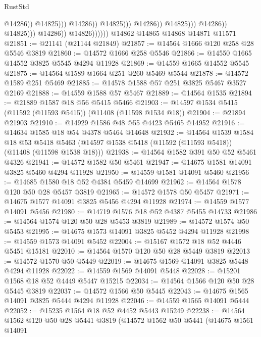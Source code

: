 \begin{lexlean}{RustStd}
\begin{coremodule}
                                                            @14286))
                                                        @14825)))
                                                  @14286))
                                              @14825)))
                                        @14286))
                                    @14825)))
                              @14286))
                          @14825)))
                    @14286))
                @14826))))))
    @14862
    @14865
    @14868
    @14871
    @11571
@21851 := @21141 (@21144 @21849)
@21857 := @14564 @1666 @120 @258 @28 @5546 @3819
@21860 := @14572 @1666 @258 @5546
@21866 := @14550 @1665 @14552 @3825 @5545 @4294 @11928
@21869 := @14559 @1665 @14552 @5545
@21875 := @14564 @1589 @1664 @251 @260 @5469 @5544
@21878 := @14572 @1589 @251 @5469
@21885 := @14578 @1588 @57 @251 @3825 @5467 @3527 @2169
@21888 := @14559 @1588 @57 @5467
@21889 := @14564 @1535
@21894 := @21889 @1587 @18 @56 @5415 @5466
@21903 := @14597 @1534 @5415 (@11592 (@11593 @5415)) (@11408 (@11598 @1534 @18))
@21904 := @21894 @21903
@21910 := @14929 @1586 @48 @55 @4423 @5465 @14952
@21916 := @14634 @1585 @18 @54 @4378 @5464 @14648
@21932 := @14564
    @1539
    @1584
    @18
    @53
    @5418
    @5463
    (@14597 @1538 @5418 (@11592 (@11593 @5418)) (@11408 (@11598 @1538 @18)))
@21938 := @14564 @1582 @391 @50 @52 @5461 @4326
@21941 := @14572 @1582 @50 @5461
@21947 := @14675 @1581 @14091 @3825 @5460 @4294 @11928
@21950 := @14559 @1581 @14091 @5460
@21956 := @14685 @1580 @18 @52 @4384 @5459 @14699
@21962 := @14564 @1578 @120 @50 @28 @5457 @3819
@21965 := @14572 @1578 @50 @5457
@21971 := @14675 @1577 @14091 @3825 @5456 @4294 @11928
@21974 := @14559 @1577 @14091 @5456
@21980 := @14719 @1576 @18 @52 @4387 @5455 @14733
@21986 := @14564 @1574 @120 @50 @28 @5453 @3819
@21989 := @14572 @1574 @50 @5453
@21995 := @14675 @1573 @14091 @3825 @5452 @4294 @11928
@21998 := @14559 @1573 @14091 @5452
@22004 := @15167 @1572 @18 @52 @4446 @5451 @15181
@22010 := @14564 @1570 @120 @50 @28 @5449 @3819
@22013 := @14572 @1570 @50 @5449
@22019 := @14675 @1569 @14091 @3825 @5448 @4294 @11928
@22022 := @14559 @1569 @14091 @5448
@22028 := @15201 @1568 @18 @52 @4449 @5447 @15215
@22034 := @14564 @1566 @120 @50 @28 @5445 @3819
@22037 := @14572 @1566 @50 @5445
@22043 := @14675 @1565 @14091 @3825 @5444 @4294 @11928
@22046 := @14559 @1565 @14091 @5444
@22052 := @15235 @1564 @18 @52 @4452 @5443 @15249
@22238 := @14564
    @1562
    @120
    @50
    @28
    @5441
    @3819
    (@14572
      @1562
      @50
      @5441
      (@14675
        @1561
        @14091

\end{coremodule}
\end{lexlean}

